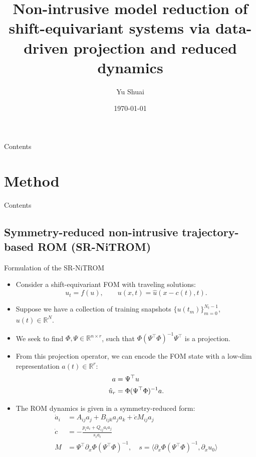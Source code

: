 \documentclass[presentation]{beamer}
\author{Yu Shuai}
\date{\today}
\title{Non-intrusive model reduction of shift-equivariant systems via data-driven projection and reduced dynamics}
\begin{document}
\maketitle
\begin{frame}{Contents}
\tableofcontents[hideallsubsections]
\end{frame}

\section{Method}
\label{sec:org5751021}
\begin{frame}{Contents}
\end{frame}

\subsection{Symmetry-reduced non-intrusive trajectory-based ROM (SR-NiTROM)}
\label{sec:org7ff6d44}
\begin{frame}[label={sec:org6031996}]{Formulation of the SR-NiTROM}
\begin{itemize}[<+->]
\item Consider a shift-equivariant FOM with traveling solutions:
\begin{equation}
   \label{eq:1}
   u_{t} = f(u), \qquad u(x, t) = \hat{u}(x - c(t), t).
\end{equation}
\item Suppose we have a collection of training snapshots \(\{u(t_{m})\}_{m = 0}^{N_{t}-1}\), \(u(t)\in\mathbb{R}^{N}\).
\item We seek to find \(\Phi, \Psi\in\mathbb{R}^{n\times r}\), such that \(\Phi(\Psi^{\top}\Phi)^{-1}\Psi^{\top}\) is a projection.
\item From this projection operator, we can encode the FOM state with a low-dim representation \(a(t)\in\mathbb{R}^{r}\):
\begin{align}
  \label{eq:2}
    a &= \Psi^{\top}u \notag\\
    \hat{u}_{r} &= \Phi(\Psi^{\top}\Phi)^{-1}a.
\end{align}
\item The ROM dynamics is given in a symmetry-reduced form:
\begin{subequations}
  \label{eq:3}
  \begin{align}
    \label{eq:3a}
    \dot{a}_{i} &= A_{ij}a_{j} + B_{ijk}a_{j}a_{k} + \dot{c} M_{ij}a_{j}\\
    \label{eq:3b}
    \dot{c} &= -\frac{p_{i}a_{i} + Q_{ij}a_{i}a_{j}}{s_{i}a_{i}}\\
    \label{eq:3c}
    M &= \Psi^{\top}\partial_{x}\Phi(\Psi^{\top}\Phi)^{-1}, \quad s = \langle\partial_{x}\Phi(\Psi^{\top}\Phi)^{-1}, \partial_{x}u_{0}\rangle
  \end{align}
\end{subequations}
\end{itemize}
\end{frame}
\end{document}
